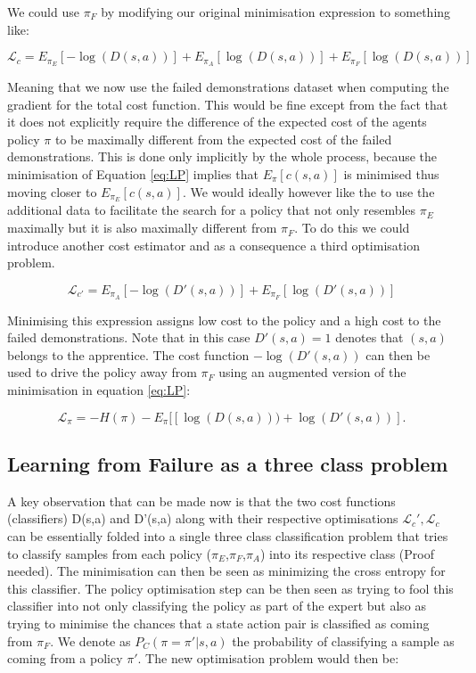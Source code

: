 \documentclass[letterpaper, 10 pt, conference]{ieeeconf}
\begin{document}
 We could use $\pi_F$ by modifying our original minimisation expression to something like:

\begin{equation}
  \mathcal{L}_c = E_{\pi_E}[-\log(D(s,a))] + E_{\pi_A}[\log(D(s,a))] + E_{\pi_F}[\log(D(s,a))] \label{eq:LCf}
\end{equation}

Meaning that we now use the failed demonstrations dataset when computing the gradient for the total cost function. This would be fine except from the fact that it does not explicitly require the difference of the expected cost of the agents policy $\pi$ to be maximally different from the expected cost of the failed demonstrations. This is done only implicitly by the whole process, because the minimisation of Equation \ref{eq:LP} implies that $E_{\pi}[c(s,a)]$ is minimised thus moving closer to $E_{\pi_E}[c(s,a)]$. We would ideally however like the to use the additional data to facilitate the search for a policy that not only resembles $\pi_E$ maximally but it is also maximally different from $\pi_F$. To do this we could introduce another cost estimator and as a consequence a third optimisation problem.

\begin{equation}
  \mathcal{L}_{c'} = E_{\pi_A}[-\log(D'(s,a))] + E_{\pi_F}[\log(D'(s,a))] \label{eq:LCp}
\end{equation}

Minimising this expression assigns low cost to the policy and a high cost to the failed demonstrations. Note that in this case $D'(s,a)=1$ denotes that $(s,a)$ belongs to the apprentice. The cost function 
$-\log(D'(s,a))$ can then be used to drive the policy away from $\pi_F$ using an augmented version of the minimisation in equation \ref{eq:LP}:

\begin{equation}
  \mathcal{L}_{\pi} = -H(\pi) - E_{\pi}[[\log(D(s,a))) + \log(D'(s,a))].  \label{eq:LPaug}
\end{equation}

\subsection{Learning from Failure as a three class problem}

A key observation that can be made now is that the two cost functions (classifiers) D(s,a) and D'(s,a) along with their respective optimisations $\mathcal{L}_c',\mathcal{L}_c$ 
can be essentially folded into a single three class classification problem that tries to classify samples from each policy ($\pi_E$,$\pi_F$,$\pi_A$) into its respective class (Proof needed). 
The minimisation can then be seen as minimizing the cross entropy for this classifier. The policy optimisation step can be then seen as trying to fool this classifier into not only classifying the policy as part 
of the expert but also as trying to minimise the chances that a state action pair is classified as coming from $\pi_F$. We denote as $P_C(\pi=\pi'|s,a)$ the probability of classifying a sample as coming from a policy $\pi'$. 
The new optimisation problem would then be:
\end{document}
